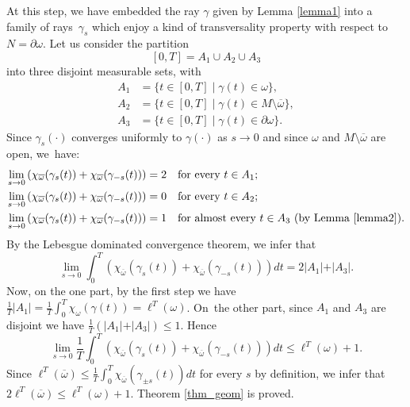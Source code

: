 \documentclass[10pt]{amsart}
\theoremstyle{definition}
\begin{document}
At this step, we have embedded the ray $\gamma$ given by Lemma \ref{lemma1} into a family of rays~$\gamma_s$ which enjoy a kind of transversality property with respect to $N=\partial\omega$.
Let us consider the partition\vspace*{-3pt}
\[
[0,T] = A_1\cup A_2\cup A_3
\]
into three disjoint measurable sets, with
\begin{equation*}
\begin{split}
A_1 &= \{ t\in[0,T]\mid \gamma(t)\in\omega \},\\
A_2 &= \{ t\in[0,T]\mid \gamma(t)\in M\setminus\overline\omega \},\\
A_3 &= \{ t\in[0,T]\mid \gamma(t)\in\partial\omega \}.
\end{split}
\end{equation*}
Since $\gamma_s(\cdot)$ converges uniformly to $\gamma(\cdot)$ as $s\rightarrow 0$ and since $\omega$ and $M\setminus\overline\omega$ are open, we~have:\vspace*{-3pt}
\begin{align*}
\lim_{s\rightarrow 0} \left( \chi_{\overline\omega}(\gamma_s(t)) + \chi_{\overline\omega}(\gamma_{-s}(t)) \right) &= 2\quad\text{for every $t\in A_1$;}\\
\lim_{s\rightarrow 0} \left( \chi_{\overline\omega}(\gamma_s(t)) + \chi_{\overline\omega}(\gamma_{-s}(t)) \right) &= 0\quad\text{for every $t\in A_2$;}\\
\lim_{s\rightarrow 0} \left( \chi_{\overline\omega}(\gamma_s(t)) + \chi_{\overline\omega}(\gamma_{-s}(t)) \right) &= 1\quad\text{for almost every $t\in A_3$ (by Lemma \ref{lemma2}).}
\end{align*}
By the Lebesgue dominated convergence theorem, we infer that\vspace*{-3pt}
\[
\lim_{s\rightarrow 0} \int_0^T \left( \chi_{\overline\omega}(\gamma_s(t)) + \chi_{\overline\omega}(\gamma_{-s}(t)) \right) dt = 2\vert A_1\vert + \vert A_3\vert.
\]
Now, on the one part, by the first step we have $\frac{1}{T} \vert A_1\vert = \frac{1}{T} \int_0^T \chi_{\omega}(\gamma(t)) = \ell^T(\omega)$.
On~the other part, since $A_1$ and $A_3$ are disjoint we have $\frac{1}{T} ( \vert A_1\vert + \vert A_3\vert ) \leq 1$. Hence\vspace*{-3pt}
\[
\lim_{s\rightarrow 0} \frac{1}{T} \int_0^T \left( \chi_{\overline\omega}(\gamma_s(t)) + \chi_{\overline\omega}(\gamma_{-s}(t)) \right) dt \leq \ell^T(\omega)+1.
\]
Since $\ell^T(\overline\omega)\leq \frac{1}{T} \int_0^T \chi_{\overline\omega}(\gamma_{\pm s}(t)) dt$ for every $s$ by definition, we infer that $2 \ell^T(\overline\omega) \leq \ell^T(\omega)+1$. Theorem \ref{thm_geom} is proved.
\end{document}
